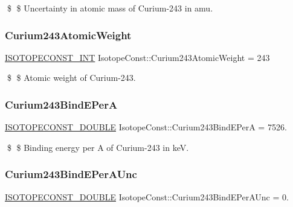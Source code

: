 \$ \$ Uncertainty in atomic mass of Curium-\/243 in amu. \mbox{\label{group___isotope_const-_curium-_cm243_ga702234042b3885ca9f20b2aae86f0035}} 
\subsubsection{\texorpdfstring{Curium243\+Atomic\+Weight}{Curium243AtomicWeight}}
{\footnotesize\ttfamily \mbox{\hyperlink{group___isotope_const-_macros_ga5f18360b3e99483a35c32d789e62621c}{I\+S\+O\+T\+O\+P\+E\+C\+O\+N\+S\+T\+\_\+\+I\+NT}} Isotope\+Const\+::\+Curium243\+Atomic\+Weight = 243}

\$ \$ Atomic weight of Curium-\/243. \mbox{\label{group___isotope_const-_curium-_cm243_ga31fb79de53e2fd961e7d07e93bfdfad4}} 
\subsubsection{\texorpdfstring{Curium243\+Bind\+E\+PerA}{Curium243BindEPerA}}
{\footnotesize\ttfamily \mbox{\hyperlink{group___isotope_const-_macros_ga8f45a7272ce02c0b4c65c44636ed719a}{I\+S\+O\+T\+O\+P\+E\+C\+O\+N\+S\+T\+\_\+\+D\+O\+U\+B\+LE}} Isotope\+Const\+::\+Curium243\+Bind\+E\+PerA = 7526.}

\$ \$ Binding energy per A of Curium-\/243 in keV. \mbox{\label{group___isotope_const-_curium-_cm243_gaf74b5ec4dd800fb71b7ab2b3eaa1b8a4}} 
\subsubsection{\texorpdfstring{Curium243\+Bind\+E\+Per\+A\+Unc}{Curium243BindEPerAUnc}}
{\footnotesize\ttfamily \mbox{\hyperlink{group___isotope_const-_macros_ga8f45a7272ce02c0b4c65c44636ed719a}{I\+S\+O\+T\+O\+P\+E\+C\+O\+N\+S\+T\+\_\+\+D\+O\+U\+B\+LE}} Isotope\+Const\+::\+Curium243\+Bind\+E\+Per\+A\+Unc = 0.}

